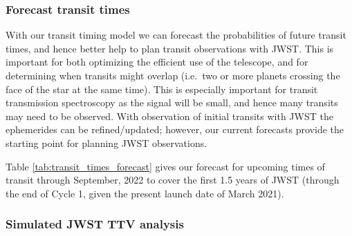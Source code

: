 \documentclass[twocolumn]{aastex63}
\begin{document}
%


\subsubsection{Forecast transit times}

With our transit timing model we can forecast the probabilities of future transit times,
and hence better help to plan transit observations with JWST.  This is
important for both optimizing the efficient use of the telescope, and for
determining when transits might overlap (i.e.\ two or more planets crossing the face
of the star at the same time).  This is especially important for transit
transmission spectroscopy as the signal will be small, and hence many 
transits may need to be observed.  With observation of initial transits
with JWST the ephemerides can be refined/updated;  however, our current
forecasts provide the starting point for planning JWST observations.

Table \ref{tab:transit_times_forecast} gives our forecast for upcoming times of transit through September, 2022 to cover the first 1.5 years of JWST (through the end of Cycle 1, given the present launch date of March 2021).


\subsubsection{Simulated JWST TTV analysis}
\end{document}
